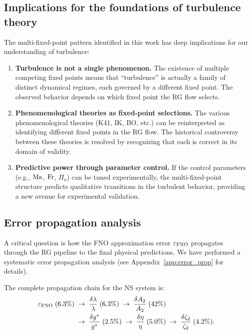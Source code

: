 \subsection{Implications for the foundations of turbulence theory}

The multi-fixed-point pattern identified in this work has deep implications for our understanding of turbulence:

\begin{enumerate}
\item \textbf{Turbulence is not a single phenomenon.} The existence of multiple competing fixed points means that ``turbulence'' is actually a family of distinct dynamical regimes, each governed by a different fixed point. The observed behavior depends on which fixed point the RG flow selects.

\item \textbf{Phenomenological theories as fixed-point selections.} The various phenomenological theories (K41, IK, BO, etc.) can be reinterpreted as identifying different fixed points in the RG flow. The historical controversy between these theories is resolved by recognizing that each is correct in its domain of validity.

\item \textbf{Predictive power through parameter control.} If the control parameters (e.g., $\mathrm{Ma}$, $\mathrm{Fr}$, $\Pi_a$) can be tuned experimentally, the multi-fixed-point structure predicts qualitative transitions in the turbulent behavior, providing a new avenue for experimental validation.
\end{enumerate}

\subsection{Error propagation analysis\label{subsec:error_prop}}

A critical question is how the FNO approximation error $\varepsilon_{\text{FNO}}$ propagates through the RG pipeline to the final physical predictions. We have performed a systematic error propagation analysis (see Appendix~\ref{app:error_prop} for details).

The complete propagation chain for the NS system is:
\begin{equation}\label{eq:error_chain}
\begin{aligned}
\varepsilon_{\text{FNO}}\;(6.3\%) \;&\to\; \frac{\delta\lambda}{\lambda}\;(6.3\%) \;\to\; \frac{\delta A_2}{A_2}\;(42\%) \\
&\to\; \frac{\delta g^*}{g^*}\;(2.5\%) \;\to\; \frac{\delta\eta}{\eta}\;(5.0\%) \;\to\; \frac{\delta\zeta_2}{\zeta_2}\;(4.2\%).
\end{aligned}
\end{equation}

